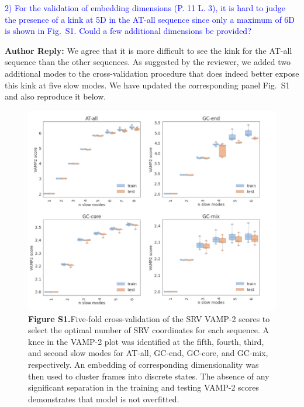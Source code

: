 \documentclass[11pt,a4paper]{letter} %
\begin{document}
\textcolor{blue}{2)      For the validation of embedding dimensions (P. 11 L. 3), it is hard to judge the presence of a kink at 5D in the AT-all sequence since only a maximum of 6D is shown in Fig.~S1. Could a few additional dimensions be provided?}

\textbf{Author Reply:}   We agree that it is more difficult to see the kink for the AT-all sequence than the other sequences. As suggested by the reviewer, we added two additional modes to the cross-validation procedure that does indeed better expose this kink at five slow modes. We have updated the corresponding panel Fig.~S1 and also reproduce it below.

\begin{figure}[ht!]
	\begin{center}
        \includegraphics[width=1.0\textwidth]{FigS1.pdf}
         \caption*{\textbf{Figure S1.}Five-fold cross-validation of the SRV VAMP-2 scores to select the optimal number of SRV coordinates for each sequence. A knee in the VAMP-2 plot was identified at the fifth, fourth, third, and second slow modes for AT-all, GC-end, GC-core, and GC-mix, respectively. An embedding of corresponding dimensionality was then used to cluster frames into discrete states. The absence of any significant separation in the training and testing VAMP-2 scores demonstrates that model is not overfitted.}
        \label{fig:SIFig1}
	\end{center}
\end{figure}
\end{document}
